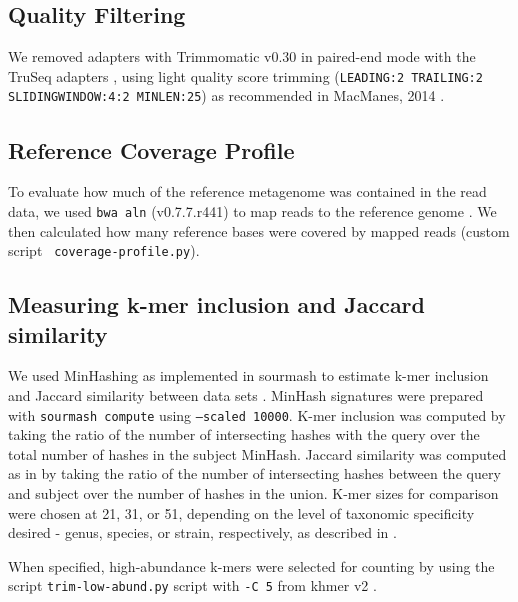 \documentclass[11pt]{article}
\begin{document}
\subsection*{Quality Filtering} 

We removed adapters with Trimmomatic v0.30 in paired-end mode with the
TruSeq adapters \cite{trimmomatic}, using light quality score trimming
({\tt LEADING:2 TRAILING:2 SLIDINGWINDOW:4:2 MINLEN:25})
as recommended in MacManes, 2014 \cite{macmanes2014optimal}.


\subsection*{Reference Coverage Profile}

To evaluate how much of the reference metagenome was contained in the
read data, we used {\tt bwa aln} (v0.7.7.r441) to map reads to the
reference genome \cite{bwa}.  We then calculated how many reference
bases were covered by mapped reads (custom script {\tt
  coverage-profile.py}).

\subsection*{Measuring k-mer inclusion and Jaccard similarity}

We used MinHashing as implemented in sourmash to estimate k-mer
inclusion and Jaccard similarity between data sets \cite{sourmash}.
MinHash signatures were prepared with {\tt sourmash compute} using
{\tt --scaled 10000}.  K-mer inclusion was computed by taking the ratio of
the number of intersecting hashes with the query over the total number
of hashes in the subject MinHash. Jaccard similarity was computed as
in \cite{mash} by taking the ratio of the number of intersecting
hashes between the query and subject over the number of hashes in the
union.  K-mer sizes for comparison were chosen at 21, 31, or 51,
depending on the level of taxonomic specificity desired - genus,
species, or strain, respectively, as described in \cite{metapalette}.

When specified, high-abundance k-mers were selected for counting by
using the script {\tt trim-low-abund.py} script with {\tt -C 5} from
khmer v2 \cite{streaming, khmer2}.
\end{document}
